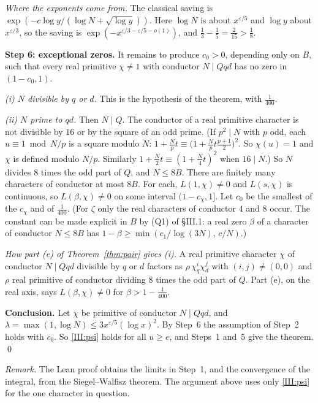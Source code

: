 \documentclass[11pt,letterpaper]{article}
\begin{document}
\emph{Where the exponents come from.} The classical saving is
$\exp(-c\log y/(\log N+\sqrt{\log y}))$. Here $\log N$ is about $x^{\varepsilon/5}$ and $\log y$ about
$x^{\varepsilon/3}$, so the saving is $\exp(-x^{\varepsilon/3-\varepsilon/5-o(1)})$, and
$\frac13-\frac15=\frac2{15}>\frac18$.

\textbf{Step 6: exceptional zeros.} It remains to produce $c_0>0$, depending only on $B$, such that every
real primitive $\chi\ne1$ with conductor $N\mid Qqd$ has no zero in $(1-c_0,1)$.

\emph{(i) $N$ divisible by $q$ or $d$.} This is the hypothesis of the theorem, with $\frac1{400}$.

\emph{(ii) $N$ prime to $qd$.} Then $N\mid Q$. The conductor of a real primitive character is not divisible
by $16$ or by the square of an odd prime. (If $p^2\mid N$ with $p$ odd, each $u\equiv1\bmod N/p$ is a square
modulo $N$: $1+\frac Npt\equiv\big(1+\frac Npt\frac{p+1}2\big)^2$. So $\chi(u)=1$ and $\chi$ is defined modulo
$N/p$. Similarly $1+\frac N2t\equiv(1+\frac N4t)^2$ when $16\mid N$.) So $N$ divides $8$ times the odd part
of $Q$, and $N\le8B$. There are finitely many characters of conductor at most $8B$. For each, $L(1,\chi)\ne0$
and $L(s,\chi)$ is continuous, so $L(\beta,\chi)\ne0$ on some interval $(1-c_\chi,1]$. Let $c_0$ be the
smallest of the $c_\chi$ and of $\frac1{400}$. (For $\zeta$ only the real characters of conductor $4$ and $8$ occur. The constant can be made explicit
in $B$ by (Q1) of \S III.1: a real zero $\beta$ of a character of conductor $N\le8B$ has
$1-\beta\ge\min(c_1/\log(3N),\,c/N)$.)

\emph{How part (e) of Theorem~\ref{thm:pair} gives (i).} A real primitive character $\chi$ of conductor
$N\mid Qqd$ divisible by $q$ or $d$ factors as $\rho\,\chi_q^i\chi_d^j$ with $(i,j)\ne(0,0)$ and $\rho$ real
primitive of conductor dividing $8$ times the odd part of $Q$. Part (e), on the real axis, says
$L(\beta,\chi)\ne0$ for $\beta>1-\frac1{400}$.

\textbf{Conclusion.} Let $\chi$ be primitive of conductor $N\mid Qqd$, and
$\lambda=\max(1,\log N)\le3x^{\varepsilon/5}(\log x)^2$. By Step~6 the assumption of Step~2 holds with $c_0$.
So \eqref{III:psi} holds for all $u\ge e$, and Steps~1 and~5 give the theorem. \qed

\emph{Remark.} The Lean proof obtains the limits in Step~1, and the convergence of the integral, from
the Siegel--Walfisz theorem. The argument above uses only \eqref{III:psi} for the one character in
question.
\end{document}
